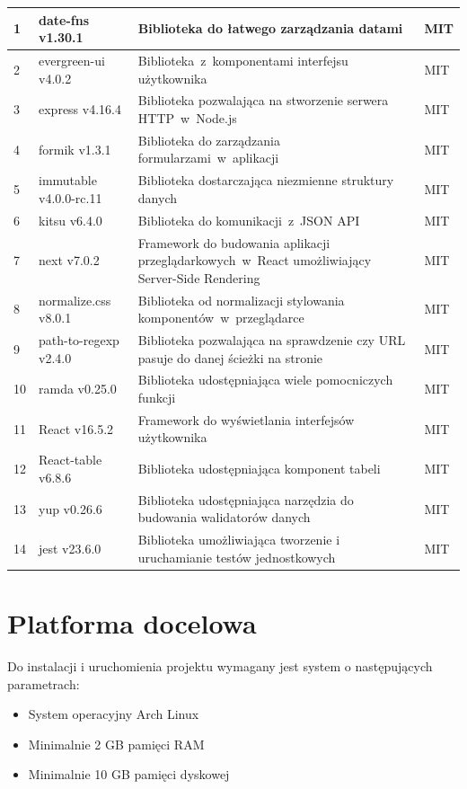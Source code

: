 \documentclass[a4paper,11pt,twoside]{report}
\theoremstyle{definition}
\begin{document}
\begin{longtable}{| p{} | p{} | p{} | p{} |}
            1 & date-fns v1.30.1 & Biblioteka do łatwego zarządzania datami & MIT \\ \hline
            2 & evergreen-ui v4.0.2 & Biblioteka~z~komponentami interfejsu użytkownika & MIT \\ \hline
            3 & express v4.16.4 & Biblioteka pozwalająca na stworzenie serwera HTTP~w~Node.js & MIT \\ \hline
            4 & formik v1.3.1 & Biblioteka do zarządzania formularzami~w~aplikacji & MIT \\ \hline
            5 & immutable v4.0.0-rc.11 & Biblioteka dostarczająca niezmienne struktury danych & MIT \\ \hline
            6 & kitsu v6.4.0 & Biblioteka do komunikacji~z~JSON API & MIT \\ \hline
            7 & next v7.0.2 & Framework do budowania aplikacji przeglądarkowych~w~React umożliwiający Server-Side Rendering & MIT \\ \hline
            8 & normalize.css v8.0.1 & Biblioteka od normalizacji stylowania komponentów~w~przeglądarce & MIT \\ \hline
            9 & path-to-regexp v2.4.0 & Biblioteka pozwalająca na sprawdzenie czy URL pasuje do danej ścieżki na stronie & MIT \\ \hline
            10 & ramda v0.25.0 & Biblioteka udostępniająca wiele pomocniczych funkcji & MIT \\ \hline
            11 & React v16.5.2 & Framework do wyświetlania interfejsów użytkownika & MIT \\ \hline
            12 & React-table v6.8.6 & Biblioteka udostępniająca komponent tabeli & MIT \\ \hline
            13 & yup v0.26.6 & Biblioteka udostępniająca narzędzia do budowania walidatorów danych & MIT \\ \hline
            14 & jest v23.6.0 & Biblioteka umożliwiająca tworzenie i uruchamianie testów jednostkowych & MIT \\ \hline
        \end{longtable}
    
    \section{Platforma docelowa}
        Do instalacji i uruchomienia projektu wymagany jest system o następujących parametrach:
        
        \begin{itemize}
            \item System operacyjny Arch Linux 
            \item Minimalnie 2 GB pamięci RAM
            \item Minimalnie 10 GB pamięci dyskowej
        \end{itemize}
        
\end{document}
